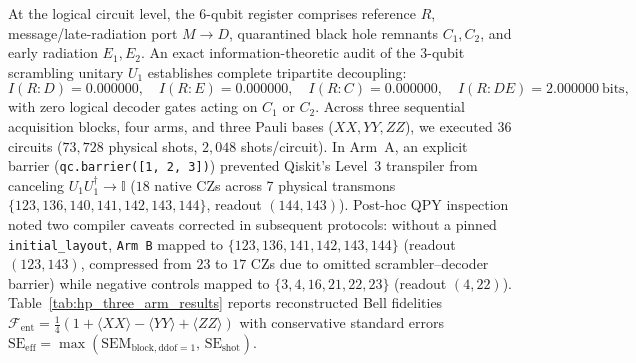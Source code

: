 \documentclass[aps,preprint,superscriptaddress,longbibliography]{revtex4-2}
\begin{document}
At the logical circuit level, the 6-qubit register comprises reference $R$, message/late-radiation port $M \to D$, quarantined black hole remnants $C_1, C_2$, and early radiation $E_1, E_2$. An exact information-theoretic audit of the 3-qubit scrambling unitary $U_1$ establishes complete tripartite decoupling:
\begin{equation}
I(R : D) = 0.000000,\quad I(R : E) = 0.000000,\quad I(R : C) = 0.000000,\quad I(R : DE) = 2.000000\ \text{bits},
\end{equation}
with zero logical decoder gates acting on $C_1$ or $C_2$. Across three sequential acquisition blocks, four arms, and three Pauli bases ($XX, YY, ZZ$), we executed 36 circuits ($73{,}728$ physical shots, $2{,}048$ shots/circuit). In Arm~A, an explicit barrier (\texttt{qc.barrier([1, 2, 3])}) prevented Qiskit's Level~3 transpiler from canceling $U_1 U_1^\dagger \to \mathbb{I}$ ($18$ native CZs across 7 physical transmons $\{123, 136, 140, 141, 142, 143, 144\}$, readout $(144, 143)$). Post-hoc QPY inspection noted two compiler caveats corrected in subsequent protocols: without a pinned \texttt{initial\_layout}, \texttt{Arm B} mapped to $\{123, 136, 141, 142, 143, 144\}$ (readout $(123, 143)$, compressed from $23$ to $17$ CZs due to omitted scrambler--decoder barrier) while negative controls mapped to $\{3, 4, 16, 21, 22, 23\}$ (readout $(4, 22)$). Table~\ref{tab:hp_three_arm_results} reports reconstructed Bell fidelities $\mathcal{F}_{\mathrm{ent}} = \frac{1}{4}(1 + \langle XX \rangle - \langle YY \rangle + \langle ZZ \rangle)$ with conservative standard errors $\mathrm{SE}_{\mathrm{eff}} = \max(\mathrm{SEM}_{\mathrm{block,ddof=1}},\, \mathrm{SE}_{\mathrm{shot}})$.
\end{document}
